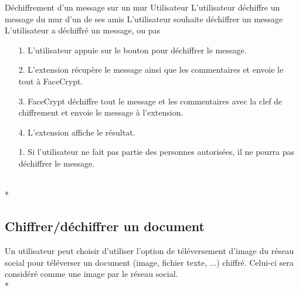 \documentclass[a4paper,11pt,french]{article}
\begin{document}
\fiche
	{Déchiffrement d'un message sur un mur}
	{Utilisateur}
	{L'utilisateur déchiffre un message du mur d'un de ses amis}
	{}
	{L'utilisateur souhaite déchiffrer un message}
	{L'utilisateur a déchiffré un message, ou pas}
    {\begin{itemize}
        \item[]
        \item[1.] L'utilisateur appuie sur le bouton pour 
            déchiffrer le message.
    \end{itemize}
    }
	{\begin{itemize}
        \item[]
		\item[2.] L'extension récupère le message ainsi que les
                commentaires et envoie le tout à 
            FaceCrypt.
        \item[3.] FaceCrypt déchiffre tout le message et les commentaires
            avec la clef de chiffrement et envoie le message à l'extension.
        \item[4.] L'extension affiche le résultat.
	\end{itemize}
	}
	{}
\flots
    {}
    {\begin{itemize}
    \item[]
    \item[1.] Si l'utilisateur ne fait pas partie des personnes
        autorisées, il ne pourra pas déchiffrer le message.
    \end{itemize}
    }
	{}    
\\*

\subsection{Chiffrer/déchiffrer un document}
Un utilisateur peut choisir d'utiliser l'option de téléversement
d'image du réseau social pour téléverser un document (image, 
fichier texte, ...) chiffré. Celui-ci sera considéré comme une image
par le réseau social.\\*
\end{document}
